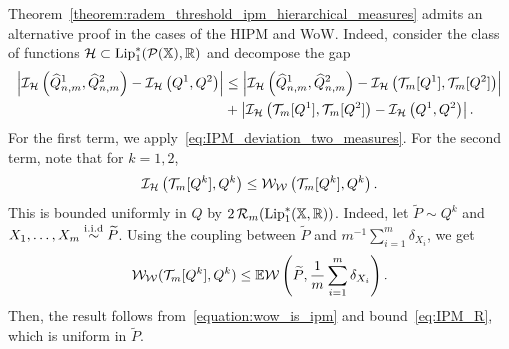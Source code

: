 \begin{remark}
Theorem~\ref{theorem:radem_threshold_ipm_hierarchical_measures} admits an alternative proof in the cases of the HIPM and WoW. Indeed, consider the class of functions $\mathcal{H}\subset \mathrm{Lip}_1^*\!\left(\mathcal{P}(\mathbb{X}),\mathbb{R}\right)$ and decompose the gap
\begin{align*}
\left| \mathcal{I}_{\mathcal{H}}\left(\widehat{Q}^1_{n,m}, \widehat{Q}^2_{n,m} \right) -
\mathcal{I}_{\mathcal{H}}\left(Q^1, Q^2 \right)\right| & \leq
\left| \mathcal{I}_{\mathcal{H}}\left(\widehat{Q}^1_{n,m}, \widehat{Q}^2_{n,m} \right) -
\mathcal{I}_{\mathcal{H}}\left(\mathcal{T}_m[Q^1], \mathcal{T}_m[Q^2] \right)\right|\\
& + \left| \mathcal{I}_{\mathcal{H}}\left(\mathcal{T}_m[Q^1], \mathcal{T}_m[Q^2] \right) -
\mathcal{I}_{\mathcal{H}}\left(Q^1, Q^2 \right) \right|.
\end{align*}
For the first term, we apply~\eqref{eq:IPM_deviation_two_measures}. For the second term, note that for $k = 1,2$,
\[
\mathcal{I}_{\mathcal{H}}\left(\mathcal{T}_m[Q^k], Q^k \right) \leq \mathcal{W}_{\mathcal{W}}\left(\mathcal{T}_m[Q^k], Q^k\right).
\]
This is bounded uniformly in $Q$ by $2\,\mathcal{R}_m(\mathrm{Lip}_1^*(\mathbb{X},\mathbb{R}))$. Indeed, let $\widetilde{P} \sim Q^k$ and $X_1, \ldots, X_m \overset{\mathrm{i.i.d}}{\sim} \widetilde{P}$. Using the coupling between $\widetilde{P}$ and $m^{-1}\sum_{i=1}^m \delta_{X_i}$, we get
\begin{equation*}
\mathcal{W}_{\mathcal{W}}(\mathcal{T}_m[Q^k],Q^k) \leq \mathbb{E} \mathcal{W} \left(\widetilde{P}, \frac{1}{m} \sum_{i=1}^m \delta_{X_i} \right).
\end{equation*}
Then, the result follows from~\eqref{equation:wow_is_ipm} and bound~\eqref{eq:IPM_R}, which is uniform in $\widetilde{P}$.
\end{remark}

